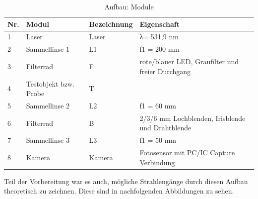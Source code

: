\documentclass[12pt,a4paper,twoside]{article}
\begin{document}
\begin{table}[H]
    \centering
    \caption{Aufbau: Module}
    \label{tab:Aufbau}
    \begin{tabular}{| l | l | l | l |}
        \hline
        Nr.  & Modul & Bezeichnung  & Eigenschaft \\
        \hline
        1 & Laser & Laser & λ= 531,9 nm \\
        2 & Sammellinse 1 & L1 & f1 = 200 mm \\
        3 & Filterrad & F & rote/blauer LED, Graufilter und freier Durchgang \\
        4 & Testobjekt bzw. Probe & T &  \\
        5 & Sammellinse 2 & L2 & f1 = 60 mm \\
        6 & Filterrad & B & 2/3/6 mm Lochblenden, Irisblende und Drahtblende \\
        7 & Sammellinse 3 & L3 & f1 =  50 mm \\
        8 & Kamera & Kamera & Fotosensor mit PC/IC Capture Verbindung \\
        \hline
    \end{tabular}
\end{table}

\noindent
Teil der Vorbereitung war es auch, mögliche Strahlengänge durch diesen Aufbau theoretisch zu zeichnen. Diese sind in nachfolgenden Abbildungen zu sehen.
\end{document}
